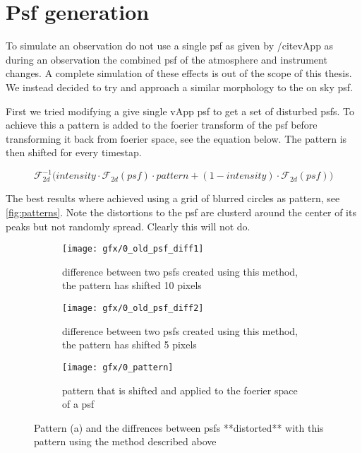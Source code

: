 \section{Psf generation}

To simulate an observation do not use a single psf as given by /cite{vApp} as during an observation the combined psf of the atmosphere and instrument changes. A complete simulation of these effects is out of the scope of this thesis. We instead decided to try and approach a similar morphology to the on sky psf. 

First we tried modifying a give single vApp psf to get a set of disturbed psfs. To achieve this a pattern is added to the foerier transform of the psf before transforming it back from foerier space, see the equation below. The pattern is then shifted for every timestap.

\begin{equation}
\mathscr{F}_{2d}^{-1} \Big( intensity \cdot \mathscr{F}_{2d}(psf) \cdot pattern + (1-intensity) \cdot \mathscr{F}_{2d}(psf) \Big)
\end{equation}

The best results where achieved using a grid of blurred circles as pattern, see \autoref{fig:patterns}. Note the distortions to the psf are clusterd around the center of its peaks but not randomly spread. Clearly this will not do.

\begin{figure}[h!]
      \begin{subfigure}[t]{0.5\textwidth}
        \texttt{[image: gfx/0\_old\_psf\_diff1]}
        \caption{difference between two psfs created using this method, the pattern has shifted 10 pixels}
      \end{subfigure}%
      \begin{subfigure}[t]{0.5\textwidth}
        \texttt{[image: gfx/0\_old\_psf\_diff2]}
        \caption{difference between two psfs created using this method, the pattern has shifted 5 pixels}
      \end{subfigure}
      
      \begin{subfigure}[]{0.5\textwidth}
        \texttt{[image: gfx/0\_pattern]}
        \caption{pattern that is shifted and applied to the foerier space of a psf}
      \end{subfigure}
      
  \caption{Pattern (a) and the diffrences between psfs **distorted** with this pattern using the method described above}
  \label{fig:patterns}
\end{figure}


